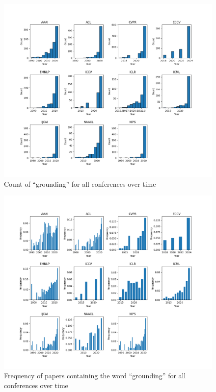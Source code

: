 \documentclass[11pt]{article}
\begin{document}
\begin{figure}[h]
  \includegraphics[width=\linewidth]{figs/year_distribution/split_by_conf_grounding_dist.png} 
  \caption {Count of ``grounding'' for all conferences over time}
\end{figure}

\begin{figure}[h]
  \includegraphics[width=\linewidth]{figs/year_distribution_freq/split_by_conf_grounding_dist.png} 
  \caption {Frequency of papers containing the word ``grounding'' for all conferences over time}
\end{figure}
\end{document}
